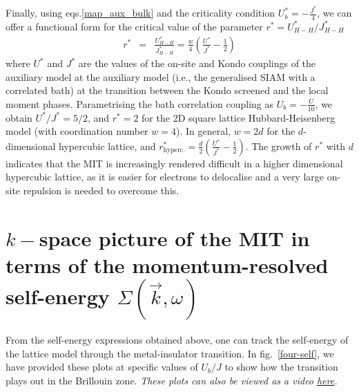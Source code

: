 \documentclass{report}
\numberwithin{equation}{section}
\begin{document}
\begin{itemize}
Finally, using eqs.\eqref{map_aux_bulk} and the criticality condition $U_{b}^{*}=-\frac{J^{*}}{4}$, we can offer a functional form for the critical value of the parameter $r^{*} = U_{H-H}^{*}/J_{H-H}^{*}$
\begin{eqnarray}
r^{*} &=& \frac{U_{H-H}^{*}}{J_{H-H}^{*}} = \frac{w}{4}\left(\frac{U^{*}}{J^{*}} - \frac{1}{2}\right)
\end{eqnarray}
where $U^{*}$ and $J^{*}$ are the values of the on-site and Kondo couplings of the auxiliary model at the auxiliary model (i.e., the generalised SIAM with a correlated bath) at the transition between the Kondo screened and the local moment phases. Parametrising the bath correlation coupling as $U_{b}=-\frac{U}{10}$, we obtain $U^{*}/J^{*}=5/2$, and $r^{*} = 2$ for the 2D square lattice Hubbard-Heisenberg model (with coordination number $w=4$). In general, $w=2d$ for the $d$-dimensional hypercubic lattice, and 
$r^{*}_\text{hyperc.} = \frac{d}{2}\left(\frac{U^{*}}{J^{*}} - \frac{1}{2}\right)$. The growth of $r^{*}$ with $d$ indicates that the MIT is increasingly rendered difficult in a higher dimensional hypercubic lattice, as it is easier for electrons to delocalise and a very large on-site repulsion is needed to overcome this.
\end{itemize}

\section{\(k-\)space picture of the MIT in terms of the momentum-resolved self-energy \(\Sigma(\vec k,\omega)\)}

From the self-energy expressions obtained above, one can track the self-energy of the lattice model through the metal-insulator transition. In fig.~\ref{four-self}, we have provided these plots at specific values of \(U_b/J\) to show how the transition plays out in the Brillouin zone. {\it These plots can also be viewed as a video \href{https://abhirup-m.github.io/misc-sigma/}{\underline{here}}.}
\end{document}
